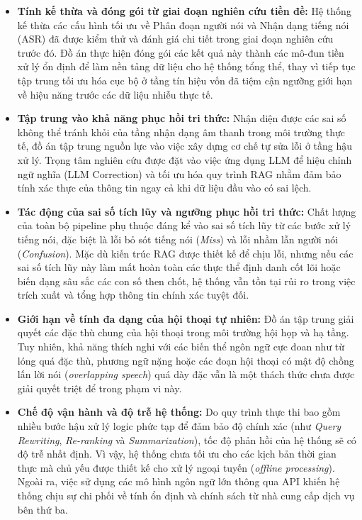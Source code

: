 \begin{itemize}[label={}]
    \item \textbf{Tính kế thừa và đóng gói từ giai đoạn nghiên cứu tiền đề:} Hệ thống kế thừa các cấu hình tối ưu về Phân đoạn người nói và Nhận dạng tiếng nói (ASR) đã được kiểm thử và đánh giá chi tiết trong giai đoạn nghiên cứu trước đó. Đồ án thực hiện đóng gói các kết quả này thành các mô-đun tiền xử lý ổn định để làm nền tảng dữ liệu cho hệ thống tổng thể, thay vì tiếp tục tập trung tối ưu hóa cục bộ ở tầng tín hiệu vốn đã tiệm cận ngưỡng giới hạn về hiệu năng trước các dữ liệu nhiễu thực tế.
    
    \item \textbf{Tập trung vào khả năng phục hồi tri thức:} Nhận diện được các sai số không thể tránh khỏi của tầng nhận dạng âm thanh trong môi trường thực tế, đồ án tập trung nguồn lực vào việc xây dựng cơ chế tự sửa lỗi ở tầng hậu xử lý. Trọng tâm nghiên cứu được đặt vào việc ứng dụng LLM để hiệu chỉnh ngữ nghĩa (LLM Correction) và tối ưu hóa quy trình RAG nhằm đảm bảo tính xác thực của thông tin ngay cả khi dữ liệu đầu vào có sai lệch.
    
    \item \textbf{Tác động của sai số tích lũy và ngưỡng phục hồi tri thức:} Chất lượng của toàn bộ pipeline phụ thuộc đáng kể vào sai số tích lũy từ các bước xử lý tiếng nói, đặc biệt là lỗi bỏ sót tiếng nói (\textit{Miss}) và lỗi nhầm lẫn người nói (\textit{Confusion}). Mặc dù kiến trúc RAG được thiết kế để chịu lỗi, nhưng nếu các sai số tích lũy này làm mất hoàn toàn các thực thể định danh cốt lõi hoặc biến dạng sâu sắc các con số then chốt, hệ thống vẫn tồn tại rủi ro trong việc trích xuất và tổng hợp thông tin chính xác tuyệt đối.
    
    \item \textbf{Giới hạn về tính đa dạng của hội thoại tự nhiên:} Đồ án tập trung giải quyết các đặc thù chung của hội thoại trong môi trường hội họp và hạ tầng. Tuy nhiên, khả năng thích nghi với các biến thể ngôn ngữ cực đoan như từ lóng quá đặc thù, phương ngữ nặng hoặc các đoạn hội thoại có mật độ chồng lấn lời nói (\textit{overlapping speech}) quá dày đặc vẫn là một thách thức chưa được giải quyết triệt để trong phạm vi này.
    
    \item \textbf{Chế độ vận hành và độ trễ hệ thống:} Do quy trình thực thi bao gồm nhiều bước hậu xử lý logic phức tạp để đảm bảo độ chính xác (như \textit{Query Rewriting}, \textit{Re-ranking} và \textit{Summarization}), tốc độ phản hồi của hệ thống sẽ có độ trễ nhất định. Vì vậy, hệ thống chưa tối ưu cho các kịch bản thời gian thực mà chủ yếu được thiết kế cho xử lý ngoại tuyến (\textit{offline processing}). Ngoài ra, việc sử dụng các mô hình ngôn ngữ lớn thông qua API khiến hệ thống chịu sự chi phối về tính ổn định và chính sách từ nhà cung cấp dịch vụ bên thứ ba.
\end{itemize}